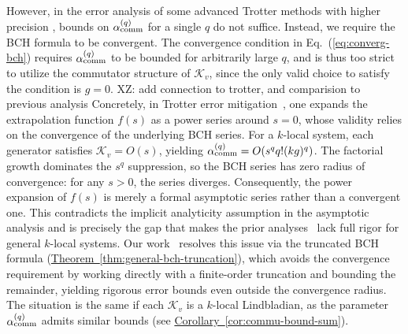 \documentclass[aps,pra,reprint,groupedaddress,floatfix]{revtex4-2}
\newcommand{\eq}[1]{(\ref{eq:#1})}
\newcommand{\thm}[1]{\hyperref[thm:#1]{Theorem~\ref*{thm:#1}}}
\newcommand{\cor}[1]{\hyperref[cor:#1]{Corollary~\ref*{cor:#1}}}
\newcommand{\mc}{\mathcal}
\newcommand{\xz}[1]{{\color{cyan} XZ: #1}}
\begin{document}
However, in the error analysis of some advanced Trotter methods with higher precision \cite{aftab2024multi, watson2025exponentially}, bounds on $\alpha_{\rm comm}^{(q)}$ for a single $q$ do not suffice. Instead, we require the BCH formula to be convergent. The convergence condition in Eq.~\eq{converg-bch} requires $\alpha_{\rm comm}^{(q)}$ to be bounded for arbitrarily large $q$, and is thus too strict to utilize the commutator structure of $\mc K_v$, since the only valid choice to satisfy the condition is $g = 0$. \xz{add connection to trotter, and comparision to previous analysis} Concretely, in Trotter error mitigation~\cite{watson2025exponentially}, one expands the extrapolation function $f(s)$ as a power series around $s=0$, whose validity relies on the convergence of the underlying BCH series. For a $k$-local system, each generator satisfies $\mc K_v = O(s)$, yielding $\alpha_{\rm comm}^{(q)} = O(s^q q! (kg)^q)$. The factorial growth dominates the $s^q$ suppression, so the BCH series has zero radius of convergence: for any $s>0$, the series diverges. Consequently, the power expansion of $f(s)$ is merely a formal asymptotic series rather than a convergent one. This contradicts the implicit analyticity assumption in the asymptotic analysis and is precisely the gap that makes the prior analyses~\cite{aftab2024multi, watson2025exponentially} lack full rigor for general $k$-local systems. Our work~\cite{wang2026lindbladiansimulationcommutatorbounds} resolves this issue via the truncated BCH formula (\thm{general-bch-truncation}), which avoids the convergence requirement by working directly with a finite-order truncation and bounding the remainder, yielding rigorous error bounds even outside the convergence radius. The situation is the same if each $\mc K_v$ is a $k$-local Lindbladian, as the parameter $\alpha_{\rm comm}^{(q)}$ admits similar bounds (see \cor{commu-bound-sum}). 
\end{document}
